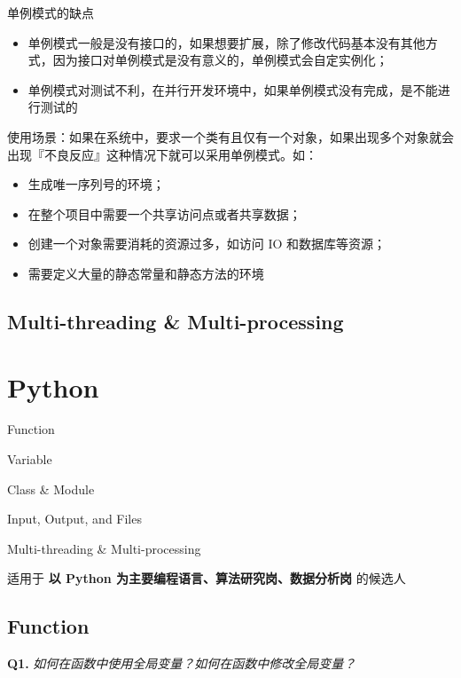\documentclass[cn,10pt,math=newtx,citestyle=gb7714-2015,bibstyle=gb7714-2015]{elegantbook}
\begin{document}
单例模式的缺点
\begin{itemize}
  \item 单例模式一般是没有接口的，如果想要扩展，除了修改代码基本没有其他方式，因为接口对单例模式是没有意义的，单例模式会自定实例化；
  \item 单例模式对测试不利，在并行开发环境中，如果单例模式没有完成，是不能进行测试的\\
\end{itemize}


使用场景：如果在系统中，要求一个类有且仅有一个对象，如果出现多个对象就会出现『不良反应』这种情况下就可以采用单例模式。如：

\begin{itemize}
  \item 生成唯一序列号的环境；
  \item 在整个项目中需要一个共享访问点或者共享数据；
  \item 创建一个对象需要消耗的资源过多，如访问 IO 和数据库等资源；
  \item 需要定义大量的静态常量和静态方法的环境
\end{itemize}


\subsection{Multi-threading \& Multi-processing}

\newpage


\section{Python}

\begin{introduction}
\item Function
\item Variable
\item Class \& Module
\item Input, Output, and Files
\item Multi-threading \& Multi-processing
\end{introduction}

适用于 \textbf{以 Python 为主要编程语言、算法研究岗、数据分析岗}  的候选人

\subsection{Function}

\textbf{Q1.} \textit{如何在函数中使用全局变量？如何在函数中修改全局变量？}
\end{document}
